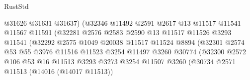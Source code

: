 \begin{lexlean}{RustStd}
\begin{coremodule}
                                      @31626
                                      @31631
                                      @31637)
                                    (@32346
                                      @11492
                                      @2591
                                      @2617
                                      @13
                                      @11517
                                      @11541
                                      @11567
                                      @11591
                                      (@32281
                                        @2576
                                        @2583
                                        @2590
                                        @13
                                        @11517
                                        @11526
                                        @3293
                                        @11541
                                        (@32292
                                          @2575
                                          @1049
                                          @20038
                                          @11517
                                          @11524
                                          @8894
                                          (@32301
                                            @2574
                                            @53
                                            @55
                                            @3976
                                            @11516
                                            @11523
                                            @3254
                                            @11497
                                            @3260
                                            @30774
                                            (@32300
                                              @2572
                                              @106
                                              @53
                                              @16
                                              @11513
                                              @3293
                                              @3273
                                              @3254
                                              @11507
                                              @3260
                                              (@30734
                                                @2571
                                                @11513
                                                (@14016 (@14017 @11513))

\end{coremodule}
\end{lexlean}
